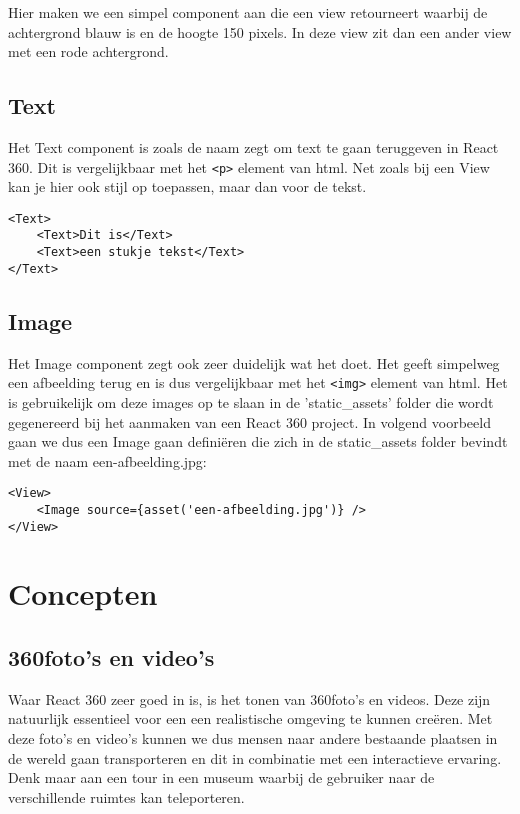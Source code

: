 Hier maken we een simpel component aan die een view retourneert waarbij de achtergrond blauw is en de hoogte 150 pixels. In deze view zit dan een ander view met een rode achtergrond.

\subsection{Text}
\label{subsec:text}
Het Text component is zoals de naam zegt om text te gaan teruggeven in React 360. Dit is vergelijkbaar met het \lstinline[basicstyle=\ttfamily\color{red}]|<p>| element van html. Net zoals bij een View kan je hier ook stijl op toepassen, maar dan voor de tekst.

\begin{lstlisting}[frame=single, caption=Het Text component met kinderen.]
<Text>
	<Text>Dit is</Text>
	<Text>een stukje tekst</Text>
</Text>
\end{lstlisting}

\subsection{Image}
\label{subsec:image}
Het Image component zegt ook zeer duidelijk wat het doet. Het geeft simpelweg een afbeelding terug en is dus vergelijkbaar met het \lstinline[basicstyle=\ttfamily\color{red}]|<img>| element van html. Het is gebruikelijk om deze images op te slaan in de 'static_assets' folder die wordt gegenereerd bij het aanmaken van een React 360 project. In volgend voorbeeld gaan we dus een Image gaan definiëren die zich in de static\_assets folder bevindt met de naam een-afbeelding.jpg:

\begin{lstlisting}[frame=single, caption=Het Image component met als bron een-afbeelding.jpg.]
<View>
	<Image source={asset('een-afbeelding.jpg')} />
</View>
\end{lstlisting}

\section{Concepten}

\subsection{360\textdegree foto's en video's}
\label{subsec:360-photo-video}
Waar React 360 zeer goed in is, is het tonen van 360\textdegree foto's en videos. Deze zijn natuurlijk essentieel voor een een realistische omgeving te kunnen creëren. Met deze foto's en video's kunnen we dus mensen naar andere bestaande plaatsen in de wereld gaan transporteren en dit in combinatie met een interactieve ervaring. Denk maar aan een tour in een museum waarbij de gebruiker naar de verschillende ruimtes kan teleporteren.

